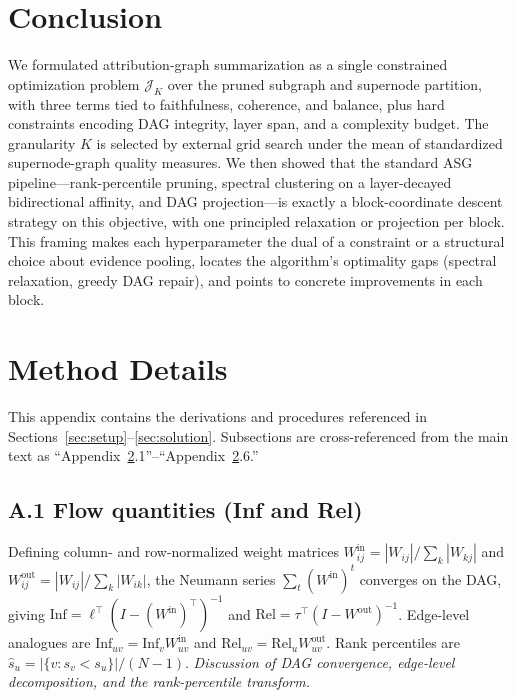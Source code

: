 \documentclass[table, 11pt]{article}
\begin{document}
\section{Conclusion}

We formulated attribution-graph summarization as a single
constrained optimization problem $\mathcal{J}_K$ over the pruned
subgraph and supernode partition, with three terms tied to
faithfulness, coherence, and balance, plus hard constraints encoding
DAG integrity, layer span, and a complexity budget. The granularity
$K$ is selected by external grid search under the mean of standardized
supernode-graph quality measures. We then showed that the standard
ASG pipeline---rank-percentile pruning, spectral clustering on a
layer-decayed bidirectional affinity, and DAG projection---is exactly
a block-coordinate descent strategy on this objective, with one
principled relaxation or projection per block. This framing makes
each hyperparameter the dual of a constraint or a structural choice
about evidence pooling, locates the algorithm's optimality gaps
(spectral relaxation, greedy DAG repair), and points to concrete
improvements in each block.





\appendix
\appendix

\section{Method Details}\label{app:method}

This appendix contains the derivations and procedures referenced in
Sections~\ref{sec:setup}--\ref{sec:solution}. Subsections are
cross-referenced from the main text as
``Appendix~\ref{app:method}.1''--``Appendix~\ref{app:method}.6.''

\subsection*{A.1 Flow quantities (Inf and Rel)}\label{app:flow}

Defining column- and row-normalized weight matrices
$W^{\text{in}}_{ij} = |W_{ij}|/\sum_k |W_{kj}|$ and
$W^{\text{out}}_{ij} = |W_{ij}|/\sum_k |W_{ik}|$, the Neumann series
$\sum_t (W^{\text{in}})^t$ converges on the DAG, giving
$\text{Inf} = \ell^\top (I - (W^{\text{in}})^\top)^{-1}$ and
$\text{Rel} = \tau^\top (I - W^{\text{out}})^{-1}$. Edge-level
analogues are $\text{Inf}_{uv} = \text{Inf}_v W^{\text{in}}_{uv}$
and $\text{Rel}_{uv} = \text{Rel}_u W^{\text{out}}_{uv}$. Rank
percentiles are $\widehat{s}_u = |\{v : s_v < s_u\}|/(N-1)$.
\emph{Discussion of DAG convergence, edge-level decomposition, and
the rank-percentile transform.}
\end{document}
